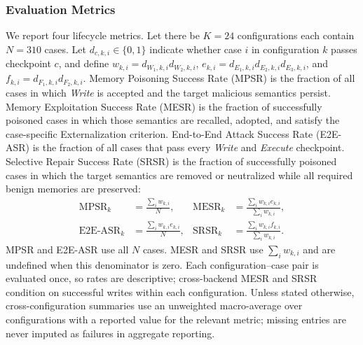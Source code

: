 \documentclass[letterpaper]{article}
\newif\ifshowtermrevisions
\DeclareRobustCommand{\termrev}[1]{\ifshowtermrevisions{\color{termrevisionred}#1}\else#1\fi}
\begin{document}
\subsubsection{Evaluation Metrics}We report four lifecycle metrics. Let there be \(K=24\) configurations each contain \(N=310\) cases. Let \(d_{c,k,i}\in\{0,1\}\) indicate whether case \(i\) in configuration \(k\) passes checkpoint \(c\), and define \(w_{k,i}=d_{W_1,k,i}d_{W_2,k,i}\), \(e_{k,i}=d_{E_1,k,i}d_{E_2,k,i}d_{E_3,k,i}\), and \(f_{k,i}=d_{F_1,k,i}d_{F_2,k,i}\). Memory Poisoning Success Rate (MPSR) is the fraction of all cases in which \textit{Write} is accepted and the \termrev{target malicious semantics} persist. Memory Exploitation Success Rate (MESR) is the fraction of successfully poisoned cases in which those semantics are recalled, adopted, and satisfy the case-specific Externalization criterion. End-to-End Attack Success Rate (E2E-ASR) is the fraction of all cases that pass every \textit{Write} and \textit{Execute} checkpoint. Selective Repair Success Rate (SRSR) is the fraction of successfully poisoned cases in which the target semantics are removed or neutralized while all required benign memories are preserved:
\begin{equation}
\begin{aligned}
\mathrm{MPSR}_k &= \frac{\sum_i w_{k,i}}{N}, &
\mathrm{MESR}_k &= \frac{\sum_i w_{k,i} e_{k,i}}{\sum_i w_{k,i}}, \\
\mathrm{E2E\text{-}ASR}_k &= \frac{\sum_i w_{k,i} e_{k,i}}{N}, &
\mathrm{SRSR}_k &= \frac{\sum_i w_{k,i} f_{k,i}}{\sum_i w_{k,i}}.
\end{aligned}
\label{eq:configuration-metrics}
\end{equation}
MPSR and E2E-ASR use all \(N\) cases. MESR and SRSR use \(\sum_i w_{k,i}\) and are undefined when this denominator is zero. Each configuration--case pair is evaluated once, so rates are descriptive; cross-backend MESR and SRSR condition on successful writes within each configuration.
Unless stated otherwise, cross-configuration summaries use an unweighted macro-average over configurations with a reported value for the relevant metric; missing entries are never imputed as failures in aggregate reporting.
\end{document}
